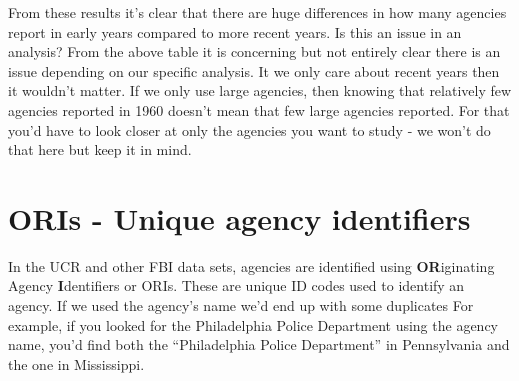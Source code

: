 \documentclass[
  12pt,
]{book}
\newenvironment{Shaded}{\begin{snugshade}}{\end{snugshade}}
\newcommand{\CommentTok}[1]{\textcolor[rgb]{0.37,0.37,0.37}{\textit{#1}}}
\newcommand{\DecValTok}[1]{\textcolor[rgb]{0.06,0.06,0.06}{#1}}
\newcommand{\KeywordTok}[1]{\textcolor[rgb]{0.27,0.27,0.27}{\textbf{#1}}}
\newcommand{\NormalTok}[1]{#1}
\newcommand{\OperatorTok}[1]{\textcolor[rgb]{0.43,0.43,0.43}{\textbf{#1}}}
\begin{document}
\begin{Shaded}
\end{Shaded}

From these results it's clear that there are huge differences in how many agencies report in early years compared to more recent years. Is this an issue in an analysis? From the above table it is concerning but not entirely clear there is an issue depending on our specific analysis. It we only care about recent years then it wouldn't matter. If we only use large agencies, then knowing that relatively few agencies reported in 1960 doesn't mean that few large agencies reported. For that you'd have to look closer at only the agencies you want to study - we won't do that here but keep it in mind.

\hypertarget{oris---unique-agency-identifiers}{%
\section{ORIs - Unique agency identifiers}\label{oris---unique-agency-identifiers}}

In the UCR and other FBI data sets, agencies are identified using \textbf{OR}iginating Agency \textbf{I}dentifiers or ORIs. These are unique ID codes used to identify an agency. If we used the agency's name we'd end up with some duplicates For example, if you looked for the Philadelphia Police Department using the agency name, you'd find both the ``Philadelphia Police Department'' in Pennsylvania and the one in Mississippi.
\end{document}
